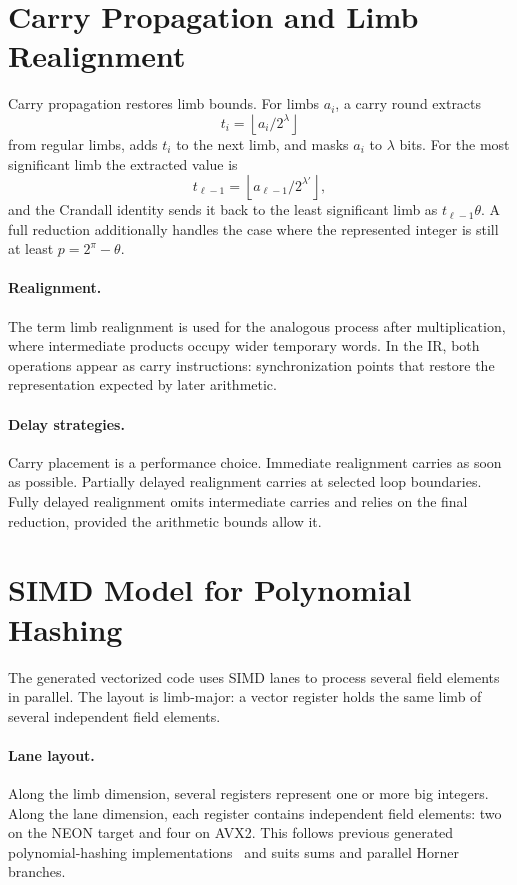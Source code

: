 \section{Carry Propagation and Limb Realignment}
\label{sec:carry-realignment}

Carry propagation restores limb bounds. For limbs \(a_i\), a carry round extracts
\[
    t_i = \left\lfloor a_i / 2^\lambda \right\rfloor
\]
from regular limbs, adds \(t_i\) to the next limb, and masks \(a_i\) to \(\lambda\) bits. For the most significant limb the extracted value is
\[
    t_{\ell-1} = \left\lfloor a_{\ell-1} / 2^{\lambda'} \right\rfloor,
\]
and the Crandall identity sends it back to the least significant limb as \(t_{\ell-1}\theta\). A full reduction additionally handles the case where the represented integer is still at least \(p=2^\pi-\theta\).

\paragraph{Realignment.}
The term limb realignment is used for the analogous process after multiplication, where intermediate products occupy wider temporary words. In the IR, both operations appear as carry instructions: synchronization points that restore the representation expected by later arithmetic.

\paragraph{Delay strategies.}
Carry placement is a performance choice. Immediate realignment carries as soon as possible. Partially delayed realignment carries at selected loop boundaries. Fully delayed realignment omits intermediate carries and relies on the final reduction, provided the arithmetic bounds allow it.

\section{SIMD Model for Polynomial Hashing}
\label{sec:simd-model}

The generated vectorized code uses SIMD lanes to process several field elements in parallel. The layout is limb-major: a vector register holds the same limb of several independent field elements.

\paragraph{Lane layout.}
Along the limb dimension, several registers represent one or more big integers. Along the lane dimension, each register contains independent field elements: two on the NEON target and four on AVX2. This follows previous generated polynomial-hashing implementations~\cite{pegolotti2026sphgen} and suits sums and parallel Horner branches.
